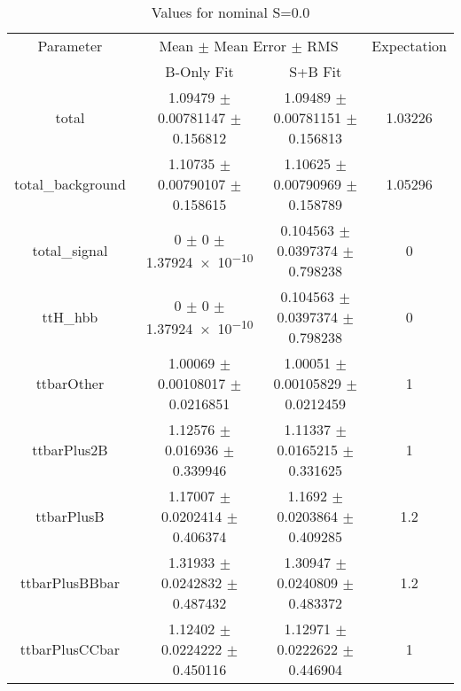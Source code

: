 \begin{table}
\centering
\caption{Values for nominal S=0.0}
\begin{tabular}{cccc}
\toprule
Parameter & \multicolumn{2}{c}{Mean $\pm$ Mean Error $\pm$ RMS} & Expectation\\
 & B-Only Fit & S+B Fit & \\
\midrule
total & \num{1.09479} $\pm$ \num{0.00781147} $\pm$ \num{0.156812} & \num{1.09489} $\pm$ \num{0.00781151} $\pm$ \num{0.156813} & \num{1.03226}\\
total\_background & \num{1.10735} $\pm$ \num{0.00790107} $\pm$ \num{0.158615} & \num{1.10625} $\pm$ \num{0.00790969} $\pm$ \num{0.158789} & \num{1.05296}\\
total\_signal & \num{0} $\pm$ \num{0} $\pm$ \num{1.37924e-10} & \num{0.104563} $\pm$ \num{0.0397374} $\pm$ \num{0.798238} & \num{0}\\
ttH\_hbb & \num{0} $\pm$ \num{0} $\pm$ \num{1.37924e-10} & \num{0.104563} $\pm$ \num{0.0397374} $\pm$ \num{0.798238} & \num{0}\\
ttbarOther & \num{1.00069} $\pm$ \num{0.00108017} $\pm$ \num{0.0216851} & \num{1.00051} $\pm$ \num{0.00105829} $\pm$ \num{0.0212459} & \num{1}\\
ttbarPlus2B & \num{1.12576} $\pm$ \num{0.016936} $\pm$ \num{0.339946} & \num{1.11337} $\pm$ \num{0.0165215} $\pm$ \num{0.331625} & \num{1}\\
ttbarPlusB & \num{1.17007} $\pm$ \num{0.0202414} $\pm$ \num{0.406374} & \num{1.1692} $\pm$ \num{0.0203864} $\pm$ \num{0.409285} & \num{1.2}\\
ttbarPlusBBbar & \num{1.31933} $\pm$ \num{0.0242832} $\pm$ \num{0.487432} & \num{1.30947} $\pm$ \num{0.0240809} $\pm$ \num{0.483372} & \num{1.2}\\
ttbarPlusCCbar & \num{1.12402} $\pm$ \num{0.0224222} $\pm$ \num{0.450116} & \num{1.12971} $\pm$ \num{0.0222622} $\pm$ \num{0.446904} & \num{1}\\
\bottomrule
\end{tabular}
\end{table}